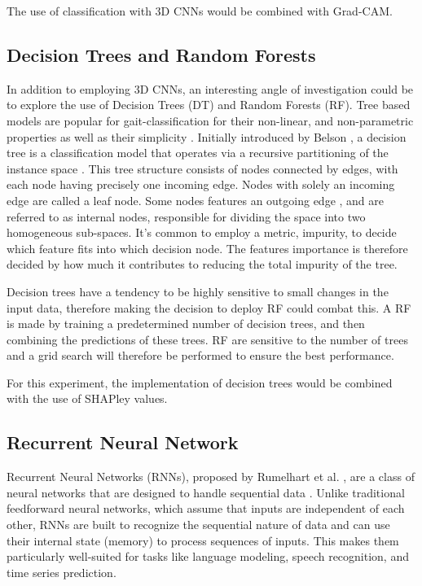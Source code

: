 \documentclass[UKenglish]{uiomasterthesis}
\begin{document}
The use of classification with 3D CNNs would be combined with Grad-CAM. 

\subsection{Decision Trees and Random Forests}
In addition to employing 3D CNNs, an interesting angle of investigation could be to explore the use of Decision Trees (DT) and Random Forests (RF). Tree based models are popular for gait-classification for their non-linear, and non-parametric properties as well as their simplicity \cite{figueiredo_automatic_2018}. Initially introduced by Belson \cite{belson_matching_1959}, a decision tree is a classification model that operates via a recursive partitioning of the instance space \cite{maimon_decision_2005}. This tree structure consists of nodes connected by edges, with each node having precisely one incoming edge. Nodes with solely an incoming edge are called a leaf node. Some nodes features an outgoing edge , and are referred to as internal nodes, responsible for dividing the space into two homogeneous sub-spaces. It's common to employ a metric, impurity, to decide which feature fits into which decision node. The features importance is therefore decided by how much it contributes to reducing the total impurity of the tree. 

Decision trees have a tendency to be highly sensitive to small changes in the input data, therefore making the decision to deploy RF could combat this. A RF is made by training a predetermined number of decision trees, and then combining the predictions of these trees. RF are sensitive to the number of trees and a grid search will therefore be performed to ensure the best performance. 

For this experiment, the implementation of decision trees would be combined with the use of SHAPley values.

\subsection{Recurrent Neural Network}
Recurrent Neural Networks (RNNs), proposed by Rumelhart et al. \cite{rumelhart_learning_1986}, are a class of neural networks that are designed to handle sequential data \cite{goodfellow_deep_2016}. Unlike traditional feedforward neural networks, which assume that inputs are independent of each other, RNNs are built to recognize the sequential nature of data and can use their internal state (memory) to process sequences of inputs. This makes them particularly well-suited for tasks like language modeling, speech recognition, and time series prediction.
\end{document}
